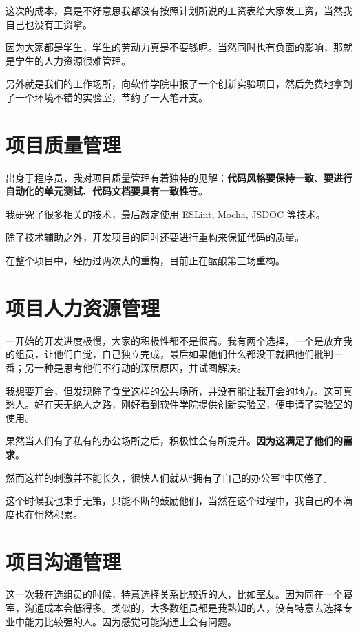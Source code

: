 这次的成本，真是不好意思我都没有按照计划所说的工资表给大家发工资，当然我自己也没有工资拿。

因为大家都是学生，学生的劳动力真是不要钱呢。当然同时也有负面的影响，那就是学生的人力资源很难管理。

另外就是我们的工作场所，向软件学院申报了一个创新实验项目，然后免费地拿到了一个环境不错的实验室，节约了一大笔开支。

\section{项目质量管理}

出身于程序员，我对项目质量管理有着独特的见解：\textbf{代码风格要保持一致}、\textbf{要进行自动化的单元测试}、\textbf{代码文档要具有一致性}等。

我研究了很多相关的技术，最后敲定使用 ESLint, Mocha, JSDOC 等技术。

除了技术辅助之外，开发项目的同时还要进行重构来保证代码的质量。

在整个项目中，经历过两次大的重构，目前正在酝酿第三场重构。

\section{项目人力资源管理}

一开始的开发进度极慢，大家的积极性都不是很高。我有两个选择，一个是放弃我的组员，让他们自觉，自己独立完成，最后如果他们什么都没干就把他们批判一番；另一种是思考他们不行动的深层原因，并试图解决。

我想要开会，但发现除了食堂这样的公共场所，并没有能让我开会的地方。这可真愁人。好在天无绝人之路，刚好看到软件学院提供创新实验室，便申请了实验室的使用。

果然当人们有了私有的办公场所之后，积极性会有所提升。\textbf{因为这满足了他们的需求}。

然而这样的刺激并不能长久，很快人们就从“拥有了自己的办公室”中厌倦了。

这个时候我也束手无策，只能不断的鼓励他们，当然在这个过程中，我自己的不满度也在悄然积累。

\section{项目沟通管理}

这一次我在选组员的时候，特意选择关系比较近的人，比如室友。因为同在一个寝室，沟通成本会低得多。类似的，大多数组员都是我熟知的人，没有特意去选择专业中能力比较强的人。因为感觉可能沟通上会有问题。

